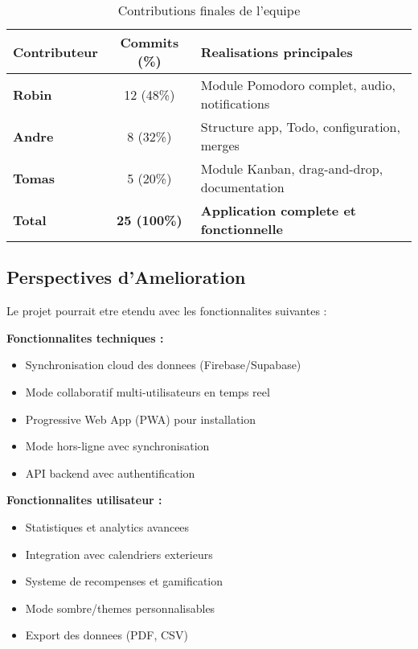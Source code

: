 \documentclass[12pt,a4paper]{article}
\begin{document}
\begin{table}[H]
\centering
\begin{tabular}{|l|c|l|}
\hline
\textbf{Contributeur} & \textbf{Commits (\%)} & \textbf{Realisations principales} \\
\hline
\textbf{Robin} & 12 (48\%) & Module Pomodoro complet, audio, notifications \\
\textbf{Andre} & 8 (32\%) & Structure app, Todo, configuration, merges \\
\textbf{Tomas} & 5 (20\%) & Module Kanban, drag-and-drop, documentation \\
\hline
\textbf{Total} & \textbf{25 (100\%)} & \textbf{Application complete et fonctionnelle} \\
\hline
\end{tabular}
\caption{Contributions finales de l'equipe}
\label{tab:final-contributions}
\end{table}

\subsection{Perspectives d'Amelioration}

Le projet pourrait etre etendu avec les fonctionnalites suivantes :

\textbf{Fonctionnalites techniques :}
\begin{itemize}
    \item Synchronisation cloud des donnees (Firebase/Supabase)
    \item Mode collaboratif multi-utilisateurs en temps reel
    \item Progressive Web App (PWA) pour installation
    \item Mode hors-ligne avec synchronisation
    \item API backend avec authentification
\end{itemize}

\textbf{Fonctionnalites utilisateur :}
\begin{itemize}
    \item Statistiques et analytics avancees
    \item Integration avec calendriers exterieurs
    \item Systeme de recompenses et gamification
    \item Mode sombre/themes personnalisables
    \item Export des donnees (PDF, CSV)
\end{itemize}
\end{document}
